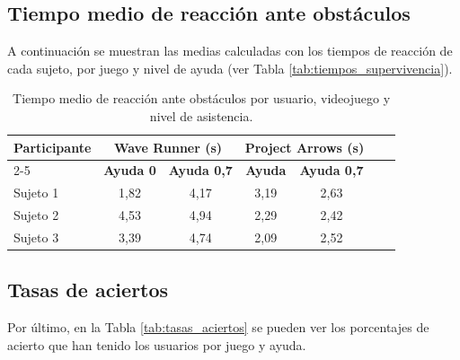 \subsection{Tiempo medio de reacción ante obstáculos}

A continuación se muestran las medias calculadas con los tiempos de reacción de
cada sujeto, por juego y nivel de ayuda (ver Tabla
\ref{tab:tiempos_supervivencia}).

\begin{table}[h!]
      \centering
      \begin{tabular}{|l|c|c|c|c|c|c|}
            \hline
            \multirow{2}{*}{\textbf{Participante}} & \multicolumn{2}{c|}{\textbf{Wave Runner (s)}} & \multicolumn{2}{c|}{\textbf{Project Arrows (s)}}                                       \\ \cline{2-5}
                                                   & \textbf{Ayuda 0}                              & \textbf{Ayuda 0,7}                               & \textbf{Ayuda} & \textbf{Ayuda 0,7} \\ \hline
            Sujeto 1                               & 1,82                                          & 4,17                                             & 3,19           & 2,63               \\ \hline
            Sujeto 2                               & 4,53                                          & 4,94                                             & 2,29           & 2,42               \\ \hline
            Sujeto 3                               & 3,39                                          & 4,74                                             & 2,09           & 2,52               \\ \hline
      \end{tabular}
      \caption{Tiempo medio de reacción ante obstáculos por usuario, videojuego y nivel de asistencia.}
      \label{tab:tiempos_medios}
\end{table}

\subsection{Tasas de aciertos}

Por último, en la Tabla \ref{tab:tasas_aciertos} se pueden ver los porcentajes
de acierto que han tenido los usuarios por juego y ayuda.

